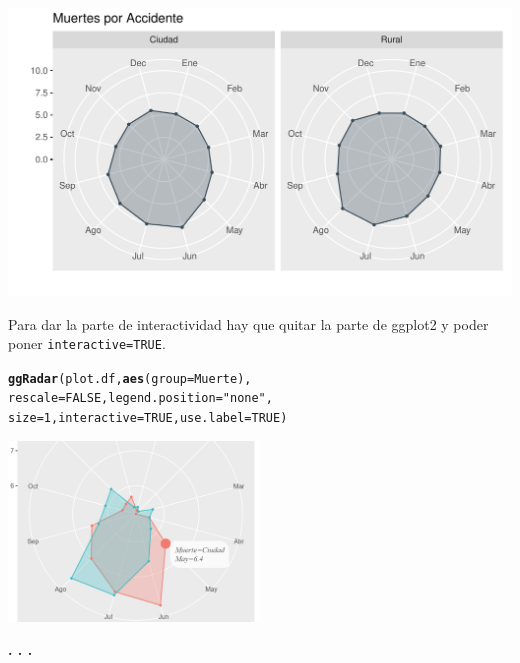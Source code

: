 \documentclass{article}\usepackage[]{graphicx}\usepackage[]{color}
\makeatletter
\def\maxwidth{ %
  \ifdim\Gin@nat@width>\linewidth
    \linewidth
  \else
    \Gin@nat@width
  \fi
}
\newcommand{\hlnum}[1]{\textcolor[rgb]{0.686,0.059,0.569}{#1}}%
\newcommand{\hlstr}[1]{\textcolor[rgb]{0.192,0.494,0.8}{#1}}%
\newcommand{\hlstd}[1]{\textcolor[rgb]{0.345,0.345,0.345}{#1}}%
\newcommand{\hlkwc}[1]{\textcolor[rgb]{0.333,0.667,0.333}{#1}}%
\newcommand{\hlkwd}[1]{\textcolor[rgb]{0.737,0.353,0.396}{\textbf{#1}}}%
\newenvironment{kframe}{%
 \def\at@end@of@kframe{}%
 \ifinner\ifhmode%
  \def\at@end@of@kframe{\end{minipage}}%
  \begin{minipage}{\columnwidth}%
 \fi\fi%
 \def\FrameCommand##1{\hskip\@totalleftmargin \hskip-\fboxsep
 \colorbox{shadecolor}{##1}\hskip-\fboxsep
     \hskip-\linewidth \hskip-\@totalleftmargin \hskip\columnwidth}%
 \MakeFramed {\advance\hsize-\width
   \@totalleftmargin\z@ \linewidth\hsize
   \@setminipage}}%
 {\par\unskip\endMakeFramed%
 \at@end@of@kframe}
\newenvironment{knitrout}{}{} %
\makeatother
\begin{document}
\begin{knitrout}
\color{fgcolor}

{\centering \includegraphics[width=\maxwidth]{figure/data_prep-1} 

}



\end{knitrout}
\clearpage
Para dar la parte de interactividad hay que quitar la parte de ggplot2 y poder poner \texttt{interactive=TRUE}.
\begin{knitrout}
\color{fgcolor}\begin{kframe}
\begin{alltt}
\hlkwd{ggRadar}\hlstd{(plot.df,} \hlkwd{aes}\hlstd{(}\hlkwc{group} \hlstd{= Muerte),}
        \hlkwc{rescale} \hlstd{=} \hlnum{FALSE}\hlstd{,} \hlkwc{legend.position} \hlstd{=} \hlstr{"none"}\hlstd{,}
        \hlkwc{size} \hlstd{=} \hlnum{1}\hlstd{,} \hlkwc{interactive} \hlstd{=} \hlnum{TRUE}\hlstd{,} \hlkwc{use.label} \hlstd{=} \hlnum{TRUE}\hlstd{)}
\end{alltt}
\end{kframe}
\end{knitrout}
\vbox{
    \centering
    \includegraphics[width=0.5\textwidth]{imag/ggplot2_interactive_radar}
}
~\\
\begin{center}
\textbf{. . .}
\end{center}
\end{document}
